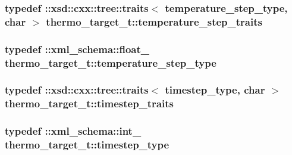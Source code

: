 \subsubsection[{\texorpdfstring{temperature\+\_\+step\+\_\+traits}{temperature_step_traits}}]{\setlength{\rightskip}{0pt plus 5cm}typedef \+::xsd\+::cxx\+::tree\+::traits$<$ {\bf temperature\+\_\+step\+\_\+type}, char $>$ {\bf thermo\+\_\+target\+\_\+t\+::temperature\+\_\+step\+\_\+traits}}\hypertarget{classthermo__target__t_a16f117780a400d02f2d96858f362f52a}{}\label{classthermo__target__t_a16f117780a400d02f2d96858f362f52a}
\subsubsection[{\texorpdfstring{temperature\+\_\+step\+\_\+type}{temperature_step_type}}]{\setlength{\rightskip}{0pt plus 5cm}typedef \+::{\bf xml\+\_\+schema\+::float\+\_\+} {\bf thermo\+\_\+target\+\_\+t\+::temperature\+\_\+step\+\_\+type}}\hypertarget{classthermo__target__t_a55faae5a0c7af8d0e9567600150603b3}{}\label{classthermo__target__t_a55faae5a0c7af8d0e9567600150603b3}
\subsubsection[{\texorpdfstring{timestep\+\_\+traits}{timestep_traits}}]{\setlength{\rightskip}{0pt plus 5cm}typedef \+::xsd\+::cxx\+::tree\+::traits$<$ {\bf timestep\+\_\+type}, char $>$ {\bf thermo\+\_\+target\+\_\+t\+::timestep\+\_\+traits}}\hypertarget{classthermo__target__t_a1c37c54b22da31cd1b012efafd0f7d6d}{}\label{classthermo__target__t_a1c37c54b22da31cd1b012efafd0f7d6d}
\subsubsection[{\texorpdfstring{timestep\+\_\+type}{timestep_type}}]{\setlength{\rightskip}{0pt plus 5cm}typedef \+::{\bf xml\+\_\+schema\+::int\+\_\+} {\bf thermo\+\_\+target\+\_\+t\+::timestep\+\_\+type}}\hypertarget{classthermo__target__t_a37e1805b2e121c0e0b0a97b2f5d1dfcb}{}\label{classthermo__target__t_a37e1805b2e121c0e0b0a97b2f5d1dfcb}


